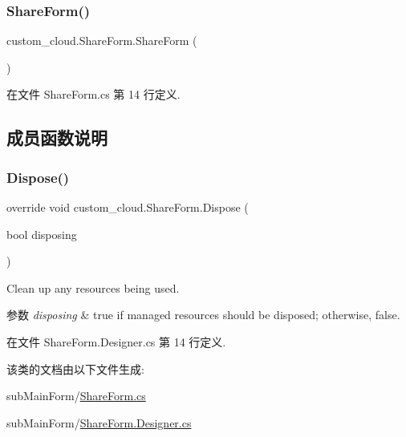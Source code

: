 \subsubsection{\texorpdfstring{Share\+Form()}{ShareForm()}}
{\footnotesize\ttfamily custom\+\_\+cloud.\+Share\+Form.\+Share\+Form (\begin{DoxyParamCaption}{ }\end{DoxyParamCaption})}



在文件 Share\+Form.\+cs 第 14 行定义.



\subsection{成员函数说明}
\mbox{\label{classcustom__cloud_1_1_share_form_ac05868b24cc132c82170cd466d9d92c6}} 
\subsubsection{\texorpdfstring{Dispose()}{Dispose()}}
{\footnotesize\ttfamily override void custom\+\_\+cloud.\+Share\+Form.\+Dispose (\begin{DoxyParamCaption}\item[{bool}]{disposing }\end{DoxyParamCaption})\hspace{0.3cm}{\ttfamily [protected]}}



Clean up any resources being used. 


\begin{DoxyParams}{参数}
{\em disposing} & true if managed resources should be disposed; otherwise, false.\\
\hline
\end{DoxyParams}


在文件 Share\+Form.\+Designer.\+cs 第 14 行定义.



该类的文档由以下文件生成\+:\begin{DoxyCompactItemize}
\item 
sub\+Main\+Form/\hyperlink{_share_form_8cs}{Share\+Form.\+cs}\item 
sub\+Main\+Form/\hyperlink{_share_form_8_designer_8cs}{Share\+Form.\+Designer.\+cs}\end{DoxyCompactItemize}
